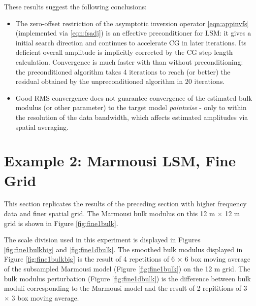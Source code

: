  

These results suggest the following conclusions: 
\begin{itemize}
\item The zero-offset restriction of the asymptotic 
  inversion operator \ref{eqn:appinvfs} (implemented via \ref{eqn:fsadj}) is an effective preconditioner for LSM: it gives a initial
  search direction and continues to accelerate CG in later
  iterations. Its deficient overall amplitude is implicitly corrected
  by the CG step length calculation.
Convergence is much faster with than without preconditioning: the
preconditioned algorithm takes 4 iterations to reach (or better) the
residual obtained by the unpreconditioned algorithm in 20 iterations.
\item Good RMS convergence does not guarantee convergence of the
  estimated bulk modulus (or other parameter) to the target model {\em
    pointwise} -
  only to within the resolution of the data bandwidth, which affects
  estimated amplitudes via spatial averaging. 
\end{itemize}

\newpage
\section{Example 2: Marmousi LSM, Fine Grid}


This section replicates the results of the preceding section with
higher frequency data and finer spatial grid. The Marmousi bulk
modulus on this 12 m $\times$ 12 m grid is shown 
in Figure \ref{fig:fine1bulk}.


The scale division used in this experiment is displayed in Figures
\ref{fig:fine1bulkbig} and \ref{fig:fine1dbulk}. The smoothed bulk
modulus displayed in Figure \ref{fig:fine1bulkbig} is the result of
4 repetitions of 6 $\times $ 6 box moving average of the subsampled
Marmousi model (Figure \ref{fig:fine1bulk}) on the 12 m grid. The
  bulk modulus perturbation (Figure \ref{fig:fine1dbulk}) is the
  difference between bulk moduli corresponding to the Marmousi model
  and the result of 2 repititions of 3 $\times$ 3 box moving average.

